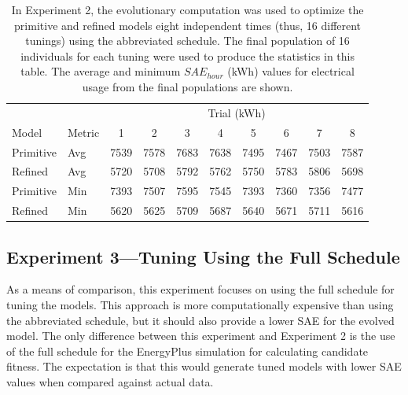 \documentclass[preprint, review, 12pt]{elsarticle}
\begin{document}
\begin{table}[htbp]
\centering
\caption{In Experiment 2, the evolutionary computation was used to optimize the primitive and refined models eight independent times (thus, 16 different tunings) using the abbreviated schedule. The final population of 16 individuals for each tuning were used to produce the statistics in this table. The average and minimum $SAE_{hour}$ (kWh) values for electrical usage from the final populations are shown.}
\label{tab:hourly-abbrev}
\begin{tabular}{llcccccccc}
\toprule
 &  & \multicolumn{8}{c}{Trial (kWh)}\\
Model & Metric & 1 & 2 & 3 & 4 & 5 & 6 & 7 & 8\\
\midrule
Primitive & Avg & 7539 & 7578 & 7683 & 7638 & 7495 & 7467 & 7503 & 7587\\\rowcolor{DarkRow}
Refined   & Avg & 5720 & 5708 & 5792 & 5762 & 5750 & 5783 & 5806 & 5698\\
Primitive & Min & 7393 & 7507 & 7595 & 7545 & 7393 & 7360 & 7356 & 7477\\\rowcolor{DarkRow}
Refined   & Min & 5620 & 5625 & 5709 & 5687 & 5640 & 5671 & 5711 & 5616\\
\bottomrule
\end{tabular}
\end{table}


\subsection{Experiment 3---Tuning Using the Full Schedule}
\label{sub:experiment3}
As a means of comparison, this experiment focuses on using the full schedule for tuning the models. This approach is more computationally expensive than using the abbreviated schedule, but it should also provide a lower SAE for the evolved model. The only difference between this experiment and Experiment 2 is the use of the full schedule for the EnergyPlus simulation for calculating candidate fitness. The expectation is that this would generate tuned models with lower SAE values when compared against actual data.
\end{document}
